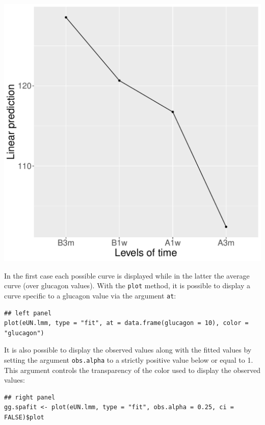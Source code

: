 \documentclass[12pt]{article}
\begin{document}
\begin{minipage}{0.45\linewidth}
\begin{center}
\includegraphics[width=\textwidth]{./figures/fit-emmip.pdf}
\end{center}
\end{minipage}

In the first case each possible curve is displayed while in the latter
the average curve (over glucagon values). With the \texttt{plot} method,
it is possible to display a curve specific to a glucagon value via the
argument \texttt{at}:
\lstset{language=r,label= ,caption= ,captionpos=b,numbers=none}
\begin{lstlisting}
## left panel
plot(eUN.lmm, type = "fit", at = data.frame(glucagon = 10), color = "glucagon") 
\end{lstlisting}

It is also possible to display the observed values along with the
fitted values by setting the argument \texttt{obs.alpha} to a strictly
positive value below or equal to 1. This argument controls the
transparency of the color used to display the observed values:
\lstset{language=r,label= ,caption= ,captionpos=b,numbers=none}
\begin{lstlisting}
## right panel
gg.spafit <- plot(eUN.lmm, type = "fit", obs.alpha = 0.25, ci = FALSE)$plot
\end{lstlisting}
\end{document}
